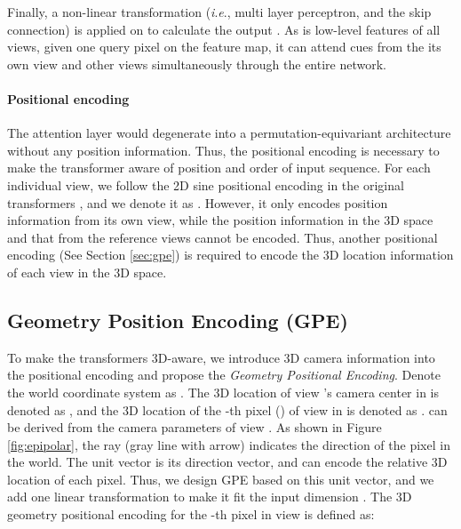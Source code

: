 \documentclass{bmvc2k}
\newcommand{\ie}{\textit{i}.\textit{e}., }
\begin{document}
Finally, a non-linear transformation (\ie multi layer perceptron, and the skip connection) is applied on  to calculate the output . 
As  is low-level features of all views, given one query pixel on the feature map, it can attend cues from the its own view and other views simultaneously through the entire network. 

\vspace{-0.8em}
\paragraph{Positional encoding}
The attention layer would degenerate into a permutation-equivariant architecture without any position information. Thus, the positional encoding is necessary to make the transformer aware of position and order of input sequence.  
For each individual view, we follow the 2D sine positional encoding in the original transformers \cite{dosovitskiy2020image, yang2020transpose}, and we denote it as . However, it only encodes position information from its own view, while the position information in the 3D space and that from the reference views cannot be encoded. Thus, another positional encoding  (See Section \ref{sec:gpe}) is required to encode the 3D location information of each view  in the 3D space. 



 




\vspace{-0.5em}
\subsection{Geometry Position Encoding (GPE)}
\vspace{-0.5em}
\label{sec:gpe}
To make the transformers 3D-aware, we introduce 3D camera information \cite{andrew2001multiple, zhao2021camera} into the positional encoding and propose the \textit{Geometry Positional Encoding}. 
Denote the world coordinate system as . The 3D location of view  's camera center in  is denoted as , and the 3D location of the -th pixel () of view  in  is denoted as  .   can be derived from the camera parameters of view .  
As shown in Figure \ref{fig:epipolar}, the ray   (gray line with arrow) indicates the direction of the pixel  in the world. 
The unit vector  is its direction vector, and can encode the relative 3D location of each pixel. 
Thus, we design GPE based on this unit vector, and we add one linear transformation to make it fit the input dimension . The 3D geometry positional encoding for the -th pixel in view  is defined as:   
\end{document}
